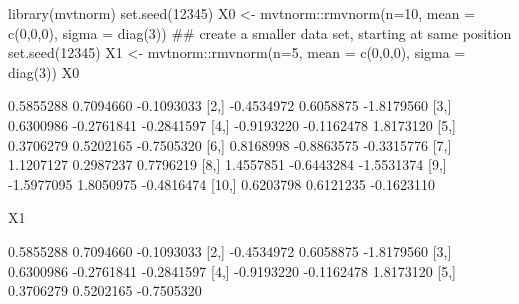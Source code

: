 \begin{Schunk}
\begin{Sinput}
    library(mvtnorm)
    set.seed(12345)
    X0 <- mvtnorm::rmvnorm(n=10, mean = c(0,0,0), sigma = diag(3))
    ## create a smaller data set, starting at same position
    set.seed(12345)
    X1 <- mvtnorm::rmvnorm(n=5,  mean = c(0,0,0), sigma = diag(3))
    X0
\end{Sinput}
\begin{Soutput}
            [,1]       [,2]       [,3]
 [1,]  0.5855288  0.7094660 -0.1093033
 [2,] -0.4534972  0.6058875 -1.8179560
 [3,]  0.6300986 -0.2761841 -0.2841597
 [4,] -0.9193220 -0.1162478  1.8173120
 [5,]  0.3706279  0.5202165 -0.7505320
 [6,]  0.8168998 -0.8863575 -0.3315776
 [7,]  1.1207127  0.2987237  0.7796219
 [8,]  1.4557851 -0.6443284 -1.5531374
 [9,] -1.5977095  1.8050975 -0.4816474
[10,]  0.6203798  0.6121235 -0.1623110
\end{Soutput}
\begin{Sinput}
    X1
\end{Sinput}
\begin{Soutput}
           [,1]       [,2]       [,3]
[1,]  0.5855288  0.7094660 -0.1093033
[2,] -0.4534972  0.6058875 -1.8179560
[3,]  0.6300986 -0.2761841 -0.2841597
[4,] -0.9193220 -0.1162478  1.8173120
[5,]  0.3706279  0.5202165 -0.7505320
\end{Soutput}
\end{Schunk}
